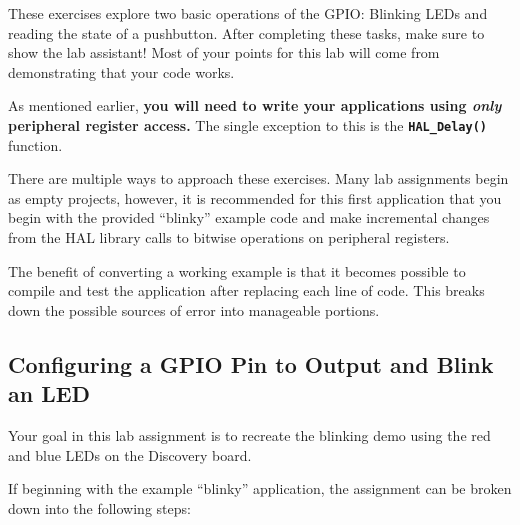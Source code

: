 \documentclass[11pt,fleqn]{book} %
\begin{document}
These exercises explore two basic operations of the GPIO: Blinking LEDs and reading the state of a pushbutton.
After completing these tasks, make sure to show the lab assistant! Most of your points for this lab will come from demonstrating that your code works. 
\begin{warning}
As mentioned earlier, \textbf{you will need to write your applications using \textit{only} peripheral register access.} The single exception to this is the \texttt{\textbf{HAL\_Delay()}} function.
\end{warning}

There are multiple ways to approach these exercises. Many lab assignments begin as empty projects, however, it is recommended for this first application that you begin with the provided ``blinky'' example code and make incremental changes from the HAL library calls to bitwise operations on peripheral registers.

The benefit of converting a working example is that it becomes possible to compile and test the application after replacing each line of code. This breaks down the possible sources of error into manageable portions. 

\subsection{Configuring a GPIO Pin to Output and Blink an LED}

Your goal in this lab assignment is to recreate the blinking demo using the red and blue LEDs on the Discovery board. 

If beginning with the example ``blinky'' application, the assignment can be broken down into the following steps:
\end{document}
